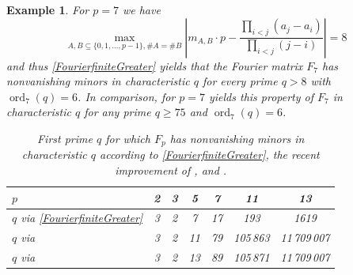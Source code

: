 \documentclass[a4paper]{article}
\newcommand{\ord}{\operatorname{ord}}
\newtheorem{example}[theorem]{Example}
\numberwithin{equation}{section}
\numberwithin{table}{section}
\numberwithin{figure}{section}
\begin{document}
\begin{example}
    For $p=7$ we have
\[
\max_{A,B \subseteq \{0,1,\ldots,p-1\}, \#A=\#B} \left| m_{A,B} \cdot p - \frac{\prod_{i<j}(a_j-a_i)}{\prod_{i<j}(j-i)}\right|=8
\]
and thus \cref{FourierfiniteGreater} yields that the Fourier matrix $F_7$ has nonvanishing minors in characteristic $q$ for every prime $q>8$ with $\ord_7(q)=6$. In comparison, for $p=7$ \cite[Theorem A]{Zhang} yields this property of $F_7$ in characteristic $q$ for any prime $q\ge 75$ and $\ord_7(q)=6$.

\begin{table}[h!]
    \centering
    \begin{tabular}{l|c c c c c c}
         $p$ & 2 & 3 & 5 & 7 & 11 & 13 \smallskip \\
         \hline
         $q$ via \cref{FourierfiniteGreater} & 3 & 2 & 7 & 17 & 193&1619\\
         $q$ via \cite{PfCaLeMa25} & 3 & 2 & 11 & 79 & 105\,863 & 11\,709\,007\\
         $q$ via \cite{Zhang} & 3 & 2 & 13 & 89 & 105\,871 & 11\,709\,007\\
    \end{tabular}
    \caption{First prime $q$ for which $F_p$ has nonvanishing minors in characteristic $q$ according to \cref{FourierfiniteGreater}, the recent improvement \cite{PfCaLeMa25} of \cite{Zhang}, and \cite[Theorem A]{Zhang}.}
    \label{tab:my_label}
\end{table}
\end{example}
\end{document}

